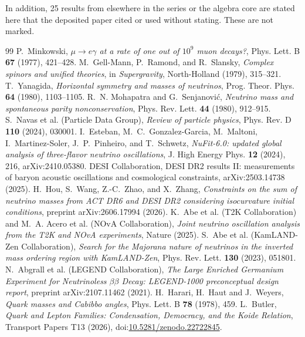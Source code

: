 \documentclass[11pt]{article}
\theoremstyle{definition}
\theoremstyle{plain}
\begin{document}
\noindent In addition, 25 results from elsewhere in the series or the algebra core are stated here that the deposited paper cited or used without stating. These are not marked.
\begin{thebibliography}{99}
 P.~Minkowski,
\emph{$\mu \to e\gamma$ at a rate of one out of $10^{9}$ muon decays?},
Phys. Lett. B \textbf{67} (1977), 421--428.
 M.~Gell-Mann, P.~Ramond, and R.~Slansky,
\emph{Complex spinors and unified theories},
in \emph{Supergravity}, North-Holland (1979), 315--321.
 T.~Yanagida,
\emph{Horizontal symmetry and masses of neutrinos},
Prog. Theor. Phys. \textbf{64} (1980), 1103--1105.
 R.~N. Mohapatra and G.~Senjanovi\'c,
\emph{Neutrino mass and spontaneous parity nonconservation},
Phys. Rev. Lett. \textbf{44} (1980), 912--915.
 S.~Navas et al. (Particle Data Group),
\emph{Review of particle physics},
Phys. Rev. D \textbf{110} (2024), 030001.
 I.~Esteban, M.~C.~Gonzalez-Garcia, M.~Maltoni, I.~Martinez-Soler, J.~P.~Pinheiro, and T.~Schwetz,
\emph{NuFit-6.0: updated global analysis of three-flavor neutrino oscillations},
J. High Energy Phys. \textbf{12} (2024), 216, arXiv:2410.05380.
 DESI Collaboration,
DESI DR2 results II: measurements of baryon acoustic oscillations and cosmological constraints,
arXiv:2503.14738 (2025).
 H.~Hou, S.~Wang, Z.-C.~Zhao, and X.~Zhang,
\emph{Constraints on the sum of neutrino masses from ACT DR6 and DESI DR2 considering isocurvature initial conditions},
preprint arXiv:2606.17994 (2026).
 K.~Abe et al. (T2K Collaboration) and M.~A. Acero et al. (NOvA Collaboration),
\emph{Joint neutrino oscillation analysis from the T2K and NOvA experiments},
Nature (2025).
 S.~Abe et al. (KamLAND-Zen Collaboration),
\emph{Search for the Majorana nature of neutrinos in the inverted mass ordering region with KamLAND-Zen},
Phys. Rev. Lett. \textbf{130} (2023), 051801.
 N.~Abgrall et al. (LEGEND Collaboration),
\emph{The Large Enriched Germanium Experiment for Neutrinoless $\beta\beta$ Decay: LEGEND-1000 preconceptual design report},
preprint arXiv:2107.11462 (2021).
 H.~Harari, H.~Haut and J.~Weyers,
\emph{Quark masses and Cabibbo angles},
Phys. Lett. B \textbf{78} (1978), 459.
 L.~Butler,
\emph{Quark and Lepton Families: Condensation, Democracy, and the Koide Relation},
Transport Papers T13 (2026), doi:\href{https://doi.org/10.5281/zenodo.22722845}{10.5281/zenodo.22722845}.

\end{thebibliography}
\end{document}
